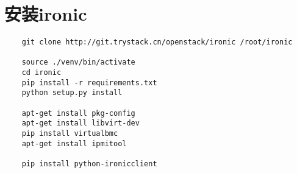 \documentclass[a4paper,left=2.5cm,right=2.5cm,11pt]{article}
\begin{document}
\tableofcontents

\clearpage

\section{安装ironic}
	\begin{lstlisting}
	git clone http://git.trystack.cn/openstack/ironic /root/ironic

	source ./venv/bin/activate
	cd ironic
	pip install -r requirements.txt
	python setup.py install

	apt-get install pkg-config
	apt-get install libvirt-dev
	pip install virtualbmc
	apt-get install ipmitool

	pip install python-ironicclient
	\end{lstlisting}
\end{document}
